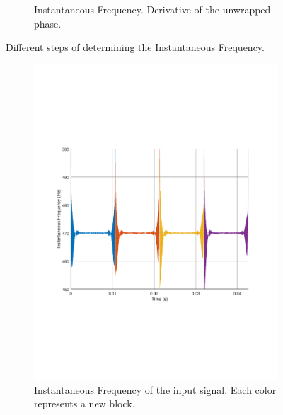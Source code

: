 \begin{figure}
\begin{subfigure}[t]{.5\textwidth}
		\caption{Instantaneous Frequency. Derivative of the unwrapped phase.}
		\label{fig:IFsub3}
	\end{subfigure} 
	\caption{Different steps of determining the Instantaneous Frequency.}
	\label{fig:IFexplained}
\end{figure}

\begin{figure}
	\centering
	\begin{subfigure}[t]{.49\textwidth}
		\centering
		\includegraphics[width=.9\linewidth, clip, trim={2cm 7cm 2cm 7cm}]{gfx/Modelling/IF.pdf}
		\caption{Instantaneous Frequency of the input signal. Each color represents a new block.}
		\label{fig:IFout1}
	\end{subfigure} \hfill
	\begin{subfigure}[t]{.49\textwidth}
		\centering

\end{subfigure}
\end{figure}
